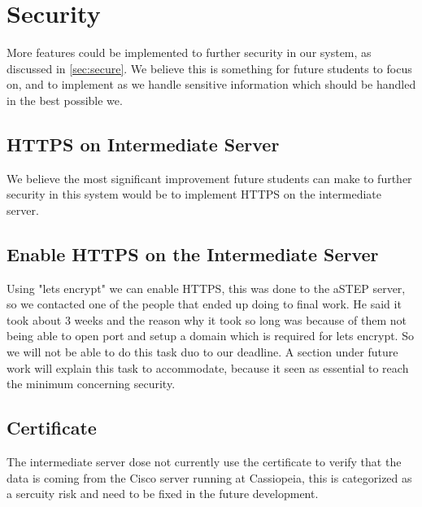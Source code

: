 \section{Security}\label{sec:fucture_secure}
More features could be implemented to further security in our system, as discussed in \cref{sec:secure}. We believe this is something for future students to focus on, and to implement as we handle sensitive information which should be handled in the best possible we.

\subsection{HTTPS on Intermediate Server}
We believe the most significant improvement future students can make to further security in this system would be to implement HTTPS on the intermediate server.
\subsection*{Enable HTTPS on the Intermediate Server}
Using "lets encrypt" we can enable HTTPS, this was done to the aSTEP server, so we contacted one of the people that ended up doing to final work. He said it took about 3 weeks and the reason why it took so long was because of them not being able to open port and setup a domain which is required for lets encrypt. So we will not be able to do this task duo to our deadline. A section under future work will explain this task to accommodate, because it seen as essential to reach the minimum concerning security.
\subsection*{Certificate}
The intermediate server dose not currently use the certificate to verify that the data is coming from the Cisco server running at Cassiopeia, this is categorized as a sercuity risk and need to be fixed in the future development.